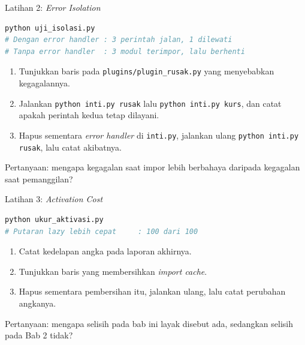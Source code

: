 \documentclass[aspectratio=169, table, 12pt]{beamer}
\begin{document}
\begin{frame}[fragile]{{\Large Latihan 2: \textit{Error Isolation}}}
  \vspace{3pt}
\begin{lstlisting}[language=bash]
python uji_isolasi.py
# Dengan error handler : 3 perintah jalan, 1 dilewati
# Tanpa error handler  : 3 modul terimpor, lalu berhenti
\end{lstlisting}

  \vspace{3pt}
  \begin{enumerate}\small
    \item Tunjukkan baris pada \texttt{plugins/plugin\_rusak.py} yang
          menyebabkan kegagalannya.
    \item Jalankan \texttt{python inti.py rusak} lalu \texttt{python inti.py
          kurs}, dan catat apakah perintah kedua tetap dilayani.
    \item Hapus sementara \textit{error handler} di \texttt{inti.py}, jalankan
          ulang \texttt{python inti.py rusak}, lalu catat akibatnya.
  \end{enumerate}

  \vspace{3pt}
  {\small Pertanyaan: mengapa kegagalan saat impor lebih berbahaya daripada
  kegagalan saat pemanggilan?}
\end{frame}

\begin{frame}[fragile]{{\Large Latihan 3: \textit{Activation Cost}}}
  \vspace{3pt}
\begin{lstlisting}[language=bash]
python ukur_aktivasi.py
# Putaran lazy lebih cepat     : 100 dari 100
\end{lstlisting}

  \vspace{3pt}
  \begin{enumerate}\small
    \item Catat kedelapan angka pada laporan akhirnya.
    \item Tunjukkan baris yang membersihkan \textit{import cache}.
    \item Hapus sementara pembersihan itu, jalankan ulang, lalu catat perubahan
          angkanya.
  \end{enumerate}

  \vspace{3pt}
  {\small Pertanyaan: mengapa selisih pada bab ini layak disebut ada, sedangkan
  selisih pada Bab 2 tidak?}
\end{frame}
\end{document}
